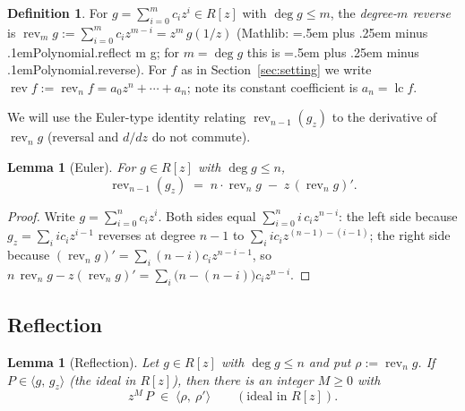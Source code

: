 \documentclass[11pt,a4paper]{article}
\newtheorem{lemma}[theorem]{Lemma}
\theoremstyle{definition}
\newtheorem{definition}[theorem]{Definition}
\newcommand{\lc}{\operatorname{lc}}
\newcommand{\rev}{\operatorname{rev}}
\newcommand{\ideal}[1]{\langle #1\rangle}
\newcommand{\code}[1]{{\ttfamily\spaceskip=.5em plus .25em minus .1em\relax #1}}
\begin{document}
\begin{definition}\label{def:rev}
For $g = \sum_{i=0}^{m} c_i z^i \in R[z]$ with $\deg g \leq m$, the
\emph{degree-$m$ reverse} is
$\rev_m g := \sum_{i=0}^{m} c_i z^{m-i} = z^m\, g(1/z)$
(Mathlib: \code{Polynomial.reflect m g}; for $m = \deg g$ this is
\code{Polynomial.reverse}). For $f$ as in Section~\ref{sec:setting} we write
$\rev f := \rev_n f = a_0 z^n + \cdots + a_n$; note its constant coefficient is
$a_n = \lc f$.
\end{definition}

We will use the Euler-type identity relating $\rev_{n-1}(g_z)$ to the
derivative of $\rev_n g$ (reversal and $d/dz$ do not commute).

\begin{lemma}[Euler]\label{lem:euler}
For $g \in R[z]$ with $\deg g \leq n$,
\[
  \rev_{n-1}(g_z) \;=\; n \cdot \rev_n g \;-\; z\,(\rev_n g)' .
\]
\end{lemma}

\begin{proof}
Write $g = \sum_{i=0}^n c_i z^i$. Both sides equal $\sum_{i=0}^n i\,c_i z^{n-i}$:
the left side because $g_z = \sum_i i c_i z^{i-1}$ reverses at degree $n-1$ to
$\sum_i i c_i z^{(n-1)-(i-1)}$; the right side because
$(\rev_n g)' = \sum_i (n-i) c_i z^{n-i-1}$, so
$n\,\rev_n g - z (\rev_n g)' = \sum_i \bigl(n-(n-i)\bigr) c_i z^{n-i}$.
\end{proof}

\subsection{Reflection}

\begin{lemma}[Reflection]\label{lem:reflect}
Let $g \in R[z]$ with $\deg g \leq n$ and put $\rho := \rev_n g$. If
$P \in \ideal{g,\, g_z}$ (the ideal in $R[z]$), then there is an integer
$M \geq 0$ with
\[
  z^{M}\,P \;\in\; \ideal{\rho,\ \rho'} \qquad (\text{ideal in } R[z]).
\]
\end{lemma}
\end{document}
